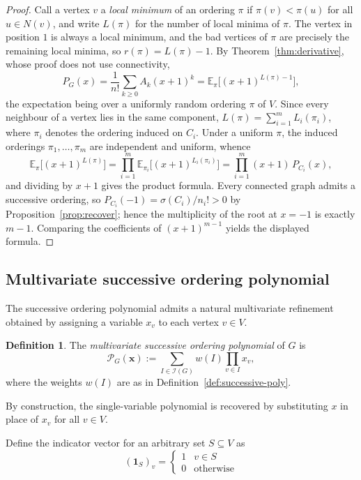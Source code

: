 \documentclass[11pt,a4paper]{article}
\numberwithin{equation}{section}
\theoremstyle{plain}
\theoremstyle{definition}
\newtheorem{definition}[theorem]{Definition}
\theoremstyle{remark}
\begin{document}
\begin{proof}
Call a vertex \(v\) a \emph{local minimum} of an ordering \(\pi\) if
\(\pi(v)<\pi(u)\) for all \(u\in N(v)\), and write \(L(\pi)\) for the number of
local minima of \(\pi\). The vertex in position \(1\) is always a local minimum,
and the bad vertices of \(\pi\) are precisely the remaining local minima, so
\(r(\pi)=L(\pi)-1\). By Theorem~\ref{thm:derivative}, whose proof does not use
connectivity,
\[
P_G(x)
=\frac{1}{n!}\sum_{k\ge0}A_k(x+1)^k
=\mathbb{E}_\pi\bigl[(x+1)^{L(\pi)-1}\bigr],
\]
the expectation being over a uniformly random ordering \(\pi\) of \(V\).
Since every neighbour of a vertex lies in the same component,
\(L(\pi)=\sum_{i=1}^{m}L_i(\pi_i)\), where \(\pi_i\) denotes the ordering induced
on \(C_i\). Under a uniform \(\pi\), the induced orderings
\(\pi_1,\dots,\pi_m\) are independent and uniform, whence
\[
\mathbb{E}_\pi\bigl[(x+1)^{L(\pi)}\bigr]
=\prod_{i=1}^{m}\mathbb{E}_{\pi_i}\bigl[(x+1)^{L_i(\pi_i)}\bigr]
=\prod_{i=1}^{m}(x+1)\,P_{C_i}(x),
\]
and dividing by \(x+1\) gives the product formula. Every connected graph admits
a successive ordering, so \(P_{C_i}(-1)=\sigma(C_i)/n_i!>0\) by
Proposition~\ref{prop:recover}; hence the multiplicity of the root at
\(x=-1\) is exactly \(m-1\). Comparing the coefficients of \((x+1)^{m-1}\)
yields the displayed formula.
\end{proof}

\subsection{Multivariate successive ordering polynomial}

The successive ordering polynomial admits a natural multivariate refinement obtained by assigning a variable \(x_v\) to each vertex \(v\in V\).

\begin{definition}
The \emph{multivariate successive ordering polynomial} of \(G\) is
\[
\mathcal P_G(\mathbf{x})
:=
\sum_{I\in\mathcal I(G)} w(I)\prod_{v\in I} x_v,
\]
where the weights \(w(I)\) are as in Definition~\ref{def:successive-poly}.
\end{definition}

By construction, the single-variable polynomial is recovered by substituting $x$ in place of $x_v$ for all \(v\in V\).

Define the indicator vector for an arbitrary set $S \subseteq V$ as  
\begin{equation*}
    (\mathbf 1_S)_v = 
    \begin{cases}
        1 & v \in S
        \\ 0 & \text{otherwise}
    \end{cases}
\end{equation*}
\end{document}
